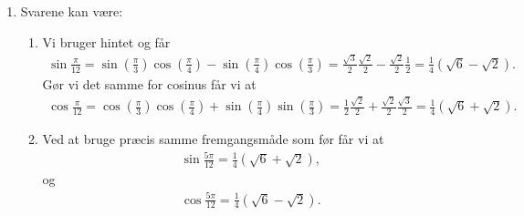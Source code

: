 \begin{enumerate}

	\item \label{it:trig5ans} Svarene kan være:
	\begin{enumerate}
		\item Vi bruger hintet og får
		\begin{align*}
		\sin\frac{\pi}{12}=\sin(\frac{\pi}{3})\cos(\frac{\pi}{4})-\sin(\frac{\pi}{4})\cos(\frac{\pi}{3})=\frac{\sqrt{3}}{2}\frac{\sqrt{2}}{2}-\frac{\sqrt{2}}{2}\frac{1}{2}=\frac{1}{4}(\sqrt{6}- \sqrt{2}).
		\end{align*}
		Gør vi det samme for cosinus får vi at
		\begin{align*}
		\cos \frac{\pi}{12}=\cos(\frac{\pi}{3})\cos(\frac{\pi}{4})+\sin(\frac{\pi}{4})\sin(\frac{\pi}{3})=\frac{1}{2}\frac{\sqrt{2}}{2}+\frac{\sqrt{2}}{2}\frac{\sqrt{3}}{2}=\frac{1}{4}(\sqrt{6}+ \sqrt{2}).
		\end{align*}
		
		\item Ved at bruge præcis samme fremgangsmåde som før får vi at 
		\begin{align*}
		\sin \frac{5\pi}{12}=\frac{1}{4}(\sqrt{6}+ \sqrt{2}),
		\end{align*}
		og 
		\begin{align*}
		\cos \frac{5\pi}{12}=\frac{1}{4}(\sqrt{6}- \sqrt{2}).
		\end{align*}
	\end{enumerate}
	

\end{enumerate}
